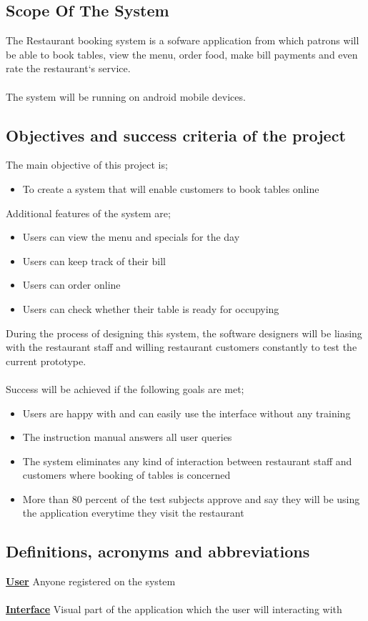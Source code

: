 \documentclass[15, notitlepage]{article}
\begin{document}
\subsection{Scope Of The System}
The Restaurant booking system is a sofware application from which patrons will be able to book tables, view the menu, order food, make bill payments and even rate the restaurant`s service.\\\\
The system will be running on android mobile devices.

\subsection{Objectives and success criteria of the project}
The main objective of this project is;
\begin{itemize}
\item To create a system that will enable customers to book tables online
\end{itemize}
Additional features of the system are;
\begin{itemize}
\item Users can view the menu and specials for the day
\item Users can keep track of their bill 
\item Users can order online
\item Users can check whether their table is ready for occupying
\end{itemize}
During the process of designing this system, the software designers will be liasing with the restaurant staff and willing restaurant customers constantly to test the current prototype.\\\\
Success will be achieved if the following goals are met;
\begin{itemize}
	\item Users are happy with and can easily use the interface without any training
	\item The instruction manual answers all user queries
	\item The system eliminates any kind of interaction between restaurant staff and customers where booking of tables is concerned
	\item More than 80 percent of the test subjects approve and say they will be using the application everytime they visit the restaurant
\end{itemize}

\subsection{Definitions, acronyms and abbreviations}
\textbf{\underline{User}} Anyone registered on the system\\\\
\textbf{\underline{Interface}} Visual part of the application which the user will interacting with
\end{document}
